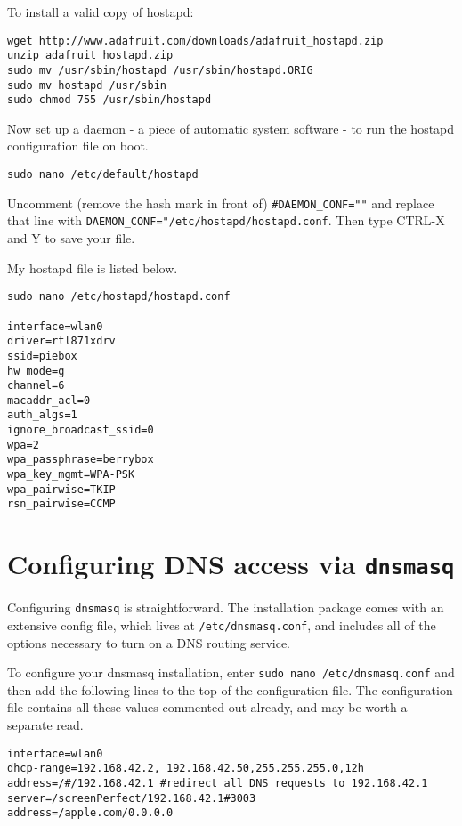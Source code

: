 To install a valid copy of hostapd:
\begin{lstlisting}
wget http://www.adafruit.com/downloads/adafruit_hostapd.zip 
unzip adafruit_hostapd.zip 
sudo mv /usr/sbin/hostapd /usr/sbin/hostapd.ORIG 
sudo mv hostapd /usr/sbin
sudo chmod 755 /usr/sbin/hostapd
\end{lstlisting}
 
Now set up a daemon - a piece of automatic system software - to run the hostapd configuration file on boot.
\begin{lstlisting}
sudo nano /etc/default/hostapd
\end{lstlisting}
Uncomment (remove the hash mark in front of) \texttt{\#DAEMON_CONF=""} and replace that line with \texttt{DAEMON_CONF="/etc/hostapd/hostapd.conf}.
Then type CTRL-X and Y to save your file.

My hostapd file is listed below.

\begin{lstlisting}
sudo nano /etc/hostapd/hostapd.conf

interface=wlan0
driver=rtl871xdrv
ssid=piebox
hw_mode=g
channel=6
macaddr_acl=0
auth_algs=1
ignore_broadcast_ssid=0
wpa=2
wpa_passphrase=berrybox
wpa_key_mgmt=WPA-PSK
wpa_pairwise=TKIP
rsn_pairwise=CCMP

\end{lstlisting}


\section{Configuring DNS access via \texttt{dnsmasq}}

Configuring \texttt{dnsmasq} is straightforward. The installation package comes with an extensive config file, which lives at \texttt{/etc/dnsmasq.conf}, and includes all of the options necessary to turn on a DNS routing service.

To configure your dnsmasq installation, enter \texttt{sudo nano /etc/dnsmasq.conf} and then add the following lines to the top of the configuration file. The configuration file contains all these values commented out already, and may be worth a separate read.

\begin{lstlisting}
interface=wlan0
dhcp-range=192.168.42.2, 192.168.42.50,255.255.255.0,12h
address=/#/192.168.42.1 #redirect all DNS requests to 192.168.42.1
server=/screenPerfect/192.168.42.1#3003
address=/apple.com/0.0.0.0
\end{lstlisting}

